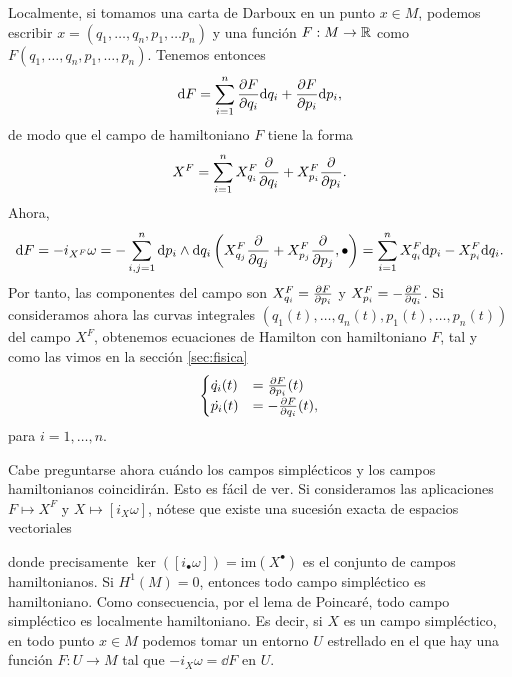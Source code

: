 Localmente, si tomamos una carta de Darboux en un punto $x\in M$, podemos escribir $x=(q_1,\dots,q_n,p_1,\dots p_n)$ y una función $F:M\rightarrow \mathbb{R}$ como $F(q_1,\dots,q_n,p_1,\dots,p_n)$. Tenemos entonces
\begin{equation*}
  \mathrm{d} F=\sum_{i=1}^n \frac{\partial F}{\partial q_i}\mathrm{d} q_i + \frac{\partial F}{\partial p_i} \mathrm{d} p_i,
\end{equation*}
de modo que el campo de hamiltoniano $F$ tiene la forma
\begin{equation*}
    X^F = \sum_{i=1}^n X_{q_i}^F \frac{\partial}{\partial q_i} + X_{p_i}^F \frac{\partial}{\partial p_i}.
\end{equation*}
  Ahora, 
  \begin{equation*}
    \mathrm{d} F =- i_{X^F}\omega=- \sum_{i,j=1}^n \mathrm{d} p_i \wedge \mathrm{d} q_i \left(X_{q_j}^F \frac{\partial}{\partial q_j} + X^F_{p_j} \frac{\partial}{\partial p_j},\bullet\right)  = \sum_{i=1}^n X_{q_i}^F \mathrm{d} p_i -X_{p_i}^F \mathrm{d} q_i.
  \end{equation*}
  Por tanto, las componentes del campo son $X^F_{q_i}=\frac{\partial F}{\partial p_i}$ y $X^F_{p_i}=-\frac{\partial F}{\partial q_i}$. Si consideramos ahora las curvas integrales $(q_1(t),\dots,q_n(t),p_1(t),\dots,p_n(t))$ del campo $X^F$, obtenemos ecuaciones de Hamilton con hamiltoniano $F$, tal y como las vimos en la sección \ref{sec:fisica}
  \begin{equation*}
  \begin{cases}
     \dot{q_i}(t) & = \frac{\partial F}{\partial p_i}(t) \\
     \dot{p_i}(t) & = -\frac{\partial F}{\partial q_i} (t),
  \end{cases}
\end{equation*}
  para $i=1,\dots,n$.

  Cabe preguntarse ahora cuándo los campos simplécticos y los campos hamiltonianos coincidirán. Esto es fácil de ver. Si consideramos las aplicaciones $F\mapsto X^F$ y $X\mapsto [i_X\omega]$, nótese que existe una sucesión exacta de espacios vectoriales
  \begin{center}
  \end{center}
  donde precisamente $\ker([i_{\bullet}\omega])=\mathrm{im}(X^{\bullet})$ es el conjunto de campos hamiltonianos.
  Si $H^1(M)=0$, entonces todo campo simpléctico es hamiltoniano. Como consecuencia, por el lema de Poincaré, todo campo simpléctico es localmente hamiltoniano. Es decir, si $X$ es un campo simpléctico, en todo punto $x\in M$ podemos tomar un entorno $U$ estrellado en el que hay una función $F:U\rightarrow M$ tal que $-i_X\omega=\dd F$ en $U$.

